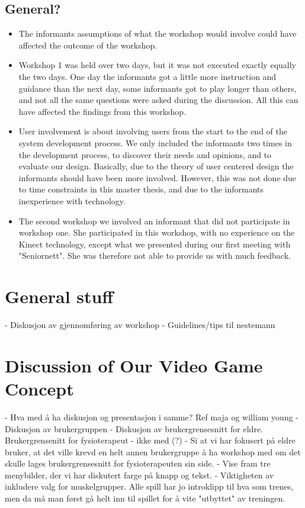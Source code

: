 \subsection{General?}
\begin{itemize}
\renewcommand{\labelitemi}{$\bullet$}
\item The informants assumptions of what the workshop would involve could have affected the outcome of the workshop. 
\item Workshop 1 was held over two days, but it was not executed exactly equally the two days. One day the informants got a little more instruction and guidance than the next day, some informants got to play longer than others, and not all the same questions were asked during the discussion. All this can have affected the findings from this workshop. 
\item User involvement is about involving users from the start to the end of the system development process. We only included the informants two times in the development process, to discover their needs and opinions, and to evaluate our design. Basically, due to the theory of user centered design the informants should have been more involved. However, this was not done due to time constraints in this master thesis, and due to the informants inexperience with technology. 
\item The second workshop we involved an informant that did not participate in workshop one. She participated in this workshop, with no experience on the Kinect technology, except what we presented during our first meeting with "Seniornett". She was therefore not able to provide us with much feedback.
\end{itemize}


\section{General stuff}
- Diskusjon av gjennomføring av workshop
- Guidelines/tips til nestemann

\section{Discussion of Our Video Game Concept}
- Hva med å ha diskusjon og presentasjon i samme? Ref maja og william young
- Diskusjon av brukergruppen
- Diskusjon av brukergrensesnitt for eldre. Brukergrensenitt for fysioterapeut - ikke med (?)
- Si at vi har fokusert på eldre bruker, at det ville krevd en helt annen brukergruppe å ha workshop med om det skulle lages brukergrensesnitt for fysioterapeuten sin side.
- Vise fram tre menybilder, der vi har diskutert farge på knapp og tekst. 
- Viktigheten av inkludere valg for muskelgrupper. Alle spill har jo introklipp til hva som trenes, men da må man først gå helt inn til spillet for å vite "utbyttet" av treningen.
